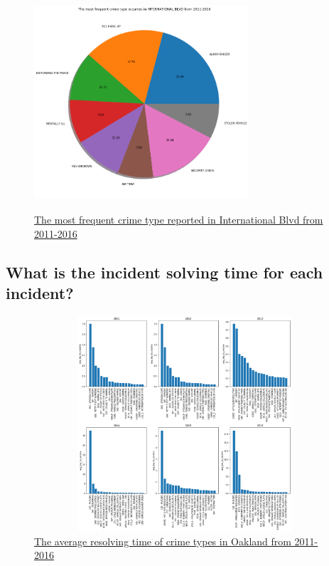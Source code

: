 \documentclass{article} %
\begin{document}
\begin{figure}[H]
	\begin{center}
		\includegraphics[height=8cm, width=8cm]{4.png}
	\end{center}
	\caption{\hyperref[appendix:plot3]{The most frequent crime type reported in International Blvd from 2011-2016}}
\end{figure}




\subsection{What is the incident solving time for each incident?}


\begin{figure}[H]
	\begin{center}
		\includegraphics[height=8cm, width=15cm]{5.png}
	\end{center}
	\caption{\hyperref[appendix:plot4]{The average resolving time of crime types in Oakland from 2011-2016}}
\end{figure}
\end{document}
